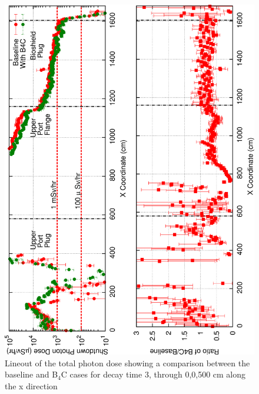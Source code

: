 \documentclass[12pt]{article}
\begin{document}
\begin{figure}[ht!]
\centering
\includegraphics[angle=-90,clip,scale=0.15]{../plots/photon_lineout/dc2_z500_lineout.png}
\caption{Lineout of the total photon dose showing a comparison between the baseline and B$_4$C cases for decay time 3,
                 through 0,0,500 cm along the x direction}
\label{fig:photons_dc3_total_dose_lineout_z500}
\end{figure}
\end{document}
